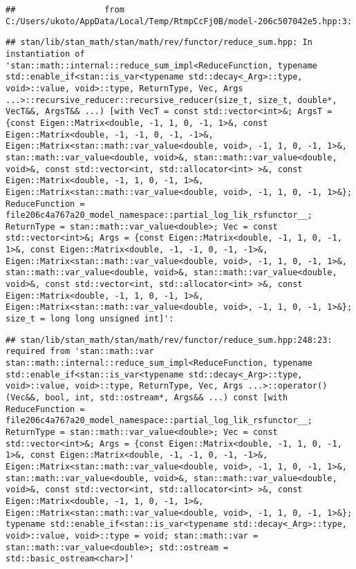 \documentclass[
]{article}
\begin{document}
\begin{verbatim}
##                  from C:/Users/ukoto/AppData/Local/Temp/RtmpCcFj0B/model-206c507042e5.hpp:3:
\end{verbatim}

\begin{verbatim}
## stan/lib/stan_math/stan/math/rev/functor/reduce_sum.hpp: In instantiation of 'stan::math::internal::reduce_sum_impl<ReduceFunction, typename std::enable_if<stan::is_var<typename std::decay<_Arg>::type, void>::value, void>::type, ReturnType, Vec, Args ...>::recursive_reducer::recursive_reducer(size_t, size_t, double*, VecT&&, ArgsT&& ...) [with VecT = const std::vector<int>&; ArgsT = {const Eigen::Matrix<double, -1, 1, 0, -1, 1>&, const Eigen::Matrix<double, -1, -1, 0, -1, -1>&, Eigen::Matrix<stan::math::var_value<double, void>, -1, 1, 0, -1, 1>&, stan::math::var_value<double, void>&, stan::math::var_value<double, void>&, const std::vector<int, std::allocator<int> >&, const Eigen::Matrix<double, -1, 1, 0, -1, 1>&, Eigen::Matrix<stan::math::var_value<double, void>, -1, 1, 0, -1, 1>&}; ReduceFunction = file206c4a767a20_model_namespace::partial_log_lik_rsfunctor__; ReturnType = stan::math::var_value<double>; Vec = const std::vector<int>&; Args = {const Eigen::Matrix<double, -1, 1, 0, -1, 1>&, const Eigen::Matrix<double, -1, -1, 0, -1, -1>&, Eigen::Matrix<stan::math::var_value<double, void>, -1, 1, 0, -1, 1>&, stan::math::var_value<double, void>&, stan::math::var_value<double, void>&, const std::vector<int, std::allocator<int> >&, const Eigen::Matrix<double, -1, 1, 0, -1, 1>&, Eigen::Matrix<stan::math::var_value<double, void>, -1, 1, 0, -1, 1>&}; size_t = long long unsigned int]':
\end{verbatim}

\begin{verbatim}
## stan/lib/stan_math/stan/math/rev/functor/reduce_sum.hpp:248:23:   required from 'stan::math::var stan::math::internal::reduce_sum_impl<ReduceFunction, typename std::enable_if<stan::is_var<typename std::decay<_Arg>::type, void>::value, void>::type, ReturnType, Vec, Args ...>::operator()(Vec&&, bool, int, std::ostream*, Args&& ...) const [with ReduceFunction = file206c4a767a20_model_namespace::partial_log_lik_rsfunctor__; ReturnType = stan::math::var_value<double>; Vec = const std::vector<int>&; Args = {const Eigen::Matrix<double, -1, 1, 0, -1, 1>&, const Eigen::Matrix<double, -1, -1, 0, -1, -1>&, Eigen::Matrix<stan::math::var_value<double, void>, -1, 1, 0, -1, 1>&, stan::math::var_value<double, void>&, stan::math::var_value<double, void>&, const std::vector<int, std::allocator<int> >&, const Eigen::Matrix<double, -1, 1, 0, -1, 1>&, Eigen::Matrix<stan::math::var_value<double, void>, -1, 1, 0, -1, 1>&}; typename std::enable_if<stan::is_var<typename std::decay<_Arg>::type, void>::value, void>::type = void; stan::math::var = stan::math::var_value<double>; std::ostream = std::basic_ostream<char>]'
\end{verbatim}
\end{document}
